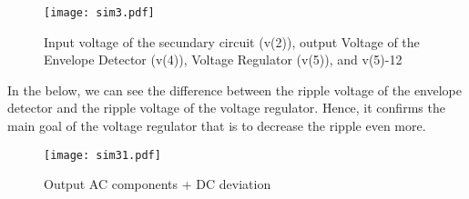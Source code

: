 \begin{figure}[h] \centering
\texttt{[image: sim3.pdf]}
\caption{Input voltage of the secundary circuit (v(2)), output Voltage of the Envelope Detector (v(4)), Voltage Regulator (v(5)), and v(5)-12}
\label{fig:sim5}
\end{figure}


In the below, we can see the difference between the ripple voltage of the envelope detector and the ripple voltage of the voltage regulator. Hence, it confirms the main goal of the voltage regulator that is to decrease the ripple even more. 
\begin{figure}[h] \centering
\texttt{[image: sim31.pdf]}
\caption{Output AC components + DC deviation}
\label{fig:sim5}
\end{figure}


